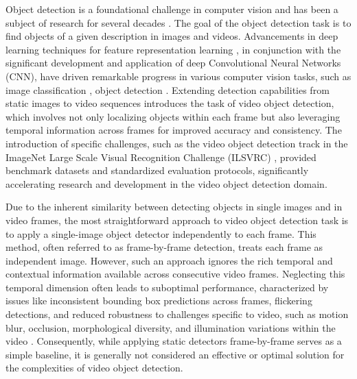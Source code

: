 Object detection is a foundational challenge in computer vision and has been a subject of research for several decades \cite{fischlerRepresentationMatchingPictorial1973}. The goal of the object detection task is to find objects of a given description in images and videos.
Advancements in deep learning techniques for feature representation learning \cite{hintonReducingDimensionalityData2006, lecunDeepLearning2015}, in conjunction with the significant development and application of deep Convolutional Neural Networks (CNN), have driven remarkable progress in various computer vision tasks, such as image classification \cite{krizhevskyImageNetClassificationDeep2012}, object detection \cite{girshickRichFeatureHierarchies2014a}.
Extending detection capabilities from static images to video sequences introduces the task of video object detection, which involves not only localizing objects within each frame but also leveraging temporal information across frames for improved accuracy and consistency.
The introduction of specific challenges, such as the video object detection track in the ImageNet Large Scale Visual Recognition Challenge (ILSVRC) \cite{russakovskyImageNetLargeScale2015}, provided benchmark datasets and standardized evaluation protocols, significantly accelerating research and development in the video object detection domain.

Due to the inherent similarity between detecting objects in single images and in video frames, the most straightforward approach to video object detection task is to apply a single-image object detector independently to each frame. 
This method, often referred to as frame-by-frame detection, treats each frame as independent image. %
However, such an approach ignores the rich temporal and contextual information available across consecutive video frames. Neglecting this temporal dimension often leads to suboptimal performance, characterized by issues like inconsistent bounding box predictions across frames, flickering detections, and reduced robustness to challenges specific to video, such as motion blur, occlusion, morphological diversity, and illumination variations within the video \cite{jiaoNewGenerationDeep2022}. 
Consequently, while applying static detectors frame-by-frame serves as a simple baseline, it is generally not considered an effective or optimal solution for the complexities of video object detection. %


